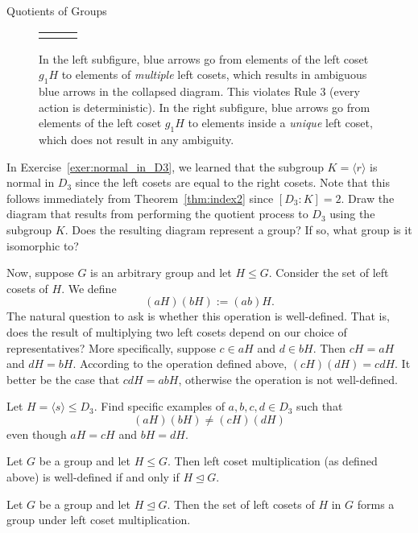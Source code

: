 \begin{section}{Quotients of Groups}
\begin{figure}[!ht]
{\begin{tabular}{ccc}
{\begin{tikzpicture}[scale=1]
\node (g2H) at (0,0) [vert] {\scriptsize $g_2H$};
\draw[b] (g1H) to (g2H);
\end{tikzpicture}}
\end{tabular}
}
\caption{In the left subfigure, blue arrows go from elements of the left coset $g_1H$ to elements of \emph{multiple} left cosets, which results in ambiguous blue arrows in the collapsed diagram. This violates Rule 3 (every action is deterministic). In the right subfigure, blue arrows go from elements of the left coset $g_1H$ to elements inside a \emph{unique} left coset, which does not result in any ambiguity.}
\label{fig:QuotientProcess}
\end{figure}

\begin{exercise}
In Exercise~\ref{exer:normal_in_D3}, we learned that the subgroup $K=\langle r\rangle$ is normal in $D_3$ since the left cosets are equal to the right cosets.  Note that this follows immediately from Theorem~\ref{thm:index2} since $[D_3:K]=2$.  Draw the diagram that results from performing the quotient process to $D_3$ using the subgroup $K$.  Does the resulting diagram represent a group?  If so, what group is it isomorphic to?
\end{exercise}

Now, suppose $G$ is an arbitrary group and let $H\leq G$. Consider the set of left cosets of $H$.  We define
\[
(aH)(bH):=(ab)H.
\]
The natural question to ask is whether this operation is well-defined.  That is, does the result of multiplying two left cosets depend on our choice of representatives?  More specifically, suppose $c\in aH$ and $d\in bH$.  Then $cH=aH$ and $dH=bH$.  According to the operation defined above, $(cH)(dH)=cdH$.  It better be the case that $cdH=abH$, otherwise the operation is not well-defined.

\begin{exercise}
Let $H=\langle s\rangle \leq D_3$.  Find specific examples of $a,b,c,d\in D_3$ such that
\[
(aH)(bH)\neq (cH)(dH)
\]
even though $aH=cH$ and $bH=dH$.
\end{exercise}

\begin{theorem}
Let $G$ be a group and let $H\leq G$.  Then left coset multiplication (as defined above) is well-defined if and only if $H\trianglelefteq G$.
\end{theorem}

\begin{theorem}\label{thm:quotient_grp}
Let $G$ be a group and let $H\trianglelefteq G$.  Then the set of left cosets of $H$ in $G$ forms a group under left coset multiplication.
\end{theorem}


\end{section}
